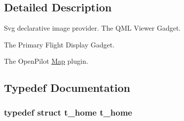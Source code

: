 \subsection{Detailed Description}
Svg declarative image provider. The Q\-M\-L Viewer Gadget.

The Primary Flight Display Gadget.

The Open\-Pilot \hyperlink{class_map}{Map} plugin.

\subsection{Typedef Documentation}
\hypertarget{group___o_p_map_plugin_ga11ae47f39c6685b33aac90d5bc1ce28f}{
\subsubsection[{t\-\_\-home}]{\setlength{\rightskip}{0pt plus 5cm}typedef {\bf struct} {\bf t\-\_\-home}  {\bf t\-\_\-home}}}\label{group___o_p_map_plugin_ga11ae47f39c6685b33aac90d5bc1ce28f}


